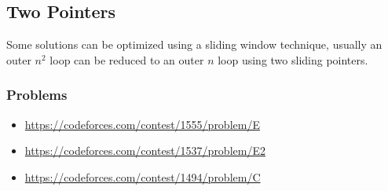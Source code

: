 \subsection{Two Pointers}
Some solutions can be optimized using a sliding window technique, usually an outer $n^2$ loop can be reduced to an outer $n$ loop using two sliding pointers. 
\subsubsection*{Problems}
\begin{itemize}
\item \url{https://codeforces.com/contest/1555/problem/E}
\item \url{https://codeforces.com/contest/1537/problem/E2}
\item \url{https://codeforces.com/contest/1494/problem/C} 
\end{itemize}
